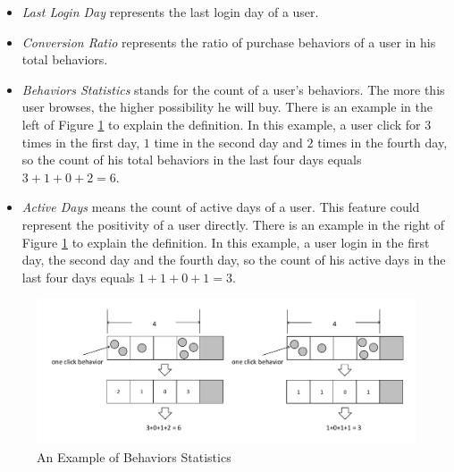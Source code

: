 \documentclass{llncs}
\begin{document}
\begin{itemize}
	\item \emph{Last Login Day} represents the last login day of a user.
	
	\item \emph{Conversion Ratio} represents the ratio of purchase behaviors of a user
	in his total behaviors.
	
	\item \emph{Behaviors Statistics} stands for the count of a user's behaviors.
	The more this user browses, the higher possibility he will buy.
	There is an example in the left of Figure \ref{fig:active} to explain the definition.
	In this example, a user click for $3$ times in the first day, $1$ time in the second day and
	$2$ times in the fourth day, so the count of his total behaviors in the last four days equals
	$3 + 1 + 0 + 2 = 6$.
	
	\item \emph{Active Days} means the count of active days of a user.
	This feature could represent the positivity of a user directly.
	There is an example in the right of Figure \ref{fig:active} to explain the definition.
	In this example, a user login in the first day, the second day and
	the fourth day, so the count of his active days in the last four days equals
	$1 + 1 + 0 + 1 = 3$.
	
\end{itemize}

\begin{figure}[htbp]
	\centering
	\includegraphics[scale=0.5]{images/active.pdf}
	\caption{An Example of Behaviors Statistics}
	\label{fig:active}
\end{figure}
\end{document}
